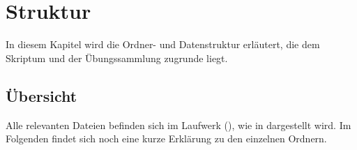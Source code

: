 \chapter{Struktur}

In diesem Kapitel wird die Ordner- und Datenstruktur erläutert, die dem Skriptum
und der Übungssammlung zugrunde liegt.

\section{\"{U}bersicht}

Alle relevanten Dateien befinden sich im Laufwerk 
(), wie in  dargestellt wird.
Im Folgenden findet sich noch eine kurze Erklärung zu den einzelnen Ordnern.

